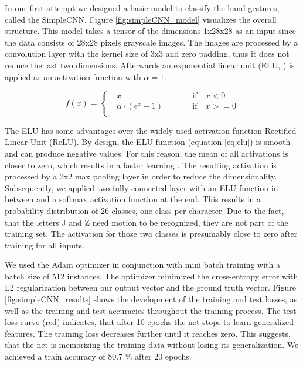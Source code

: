 \documentclass[a4paper]{article}
\begin{document}
In our first attempt we designed a basic model to classify the hand gestures, called the SimpleCNN. Figure \ref{fig:simpleCNN_model} visualizes the overall structure. This model takes a tensor of the dimensions 1x28x28 as an input since the data consists of 28x28 pixels grayscale images. The images are processed by a convolution layer with the kernel size of 3x3 and zero padding, thus it does not reduce the last two dimensions. Afterwards an exponential linear unit (ELU, \cite{clevert2015fast}) is applied as an activation function with $\alpha = 1$.
\vspace{-0.2cm}

\begin{equation}\label{eq:elu}
f(x) = \left\{\begin{alignedat}{2}
    & x && \qquad \text{if} \quad x < 0\\
    & \alpha \cdot (e^x - 1) && \qquad \text{if} \quad x >= 0\\
  \end{alignedat}\right.
\end{equation}

The ELU has some advantages over the widely used activation function Rectified Linear Unit (ReLU). By design, the ELU function (equation \ref{eq:elu}) is smooth and can produce negative values. For this reason, the mean of all activations is closer to zero, which results in a faster learning \cite{clevert2015fast}.
The resulting activation is processed by a 2x2 max pooling layer in order to reduce the dimensionality. Subsequently, we applied two fully connected layer with an ELU function in-between and a softmax activation function at the end. This results in a probability distribution of 26 classes, one class per character. Due to the fact, that the letters J and Z need motion to be recognized, they are not part of the training set. The activation for those two classes is presumably close to zero after training for all inputs.

We used the Adam optimizer \cite{Kingma2014} in conjunction with mini batch training with a batch size of 512 instances. The optimizer minimized the cross-entropy error with L2 regularization between our output vector and the ground truth vector. 
Figure \ref{fig:simpleCNN_results} shows the development of the training and test losses, as well as the training and test accuracies throughout the training process. The test loss curve (red) indicates, that after 10 epochs the net stops to learn generalized features. The training loss decreases further until it reaches zero. This suggests, that the net is memorizing the training data without losing its generalization. We achieved a train accuracy of 80.7 \% after 20 epochs.
\end{document}
